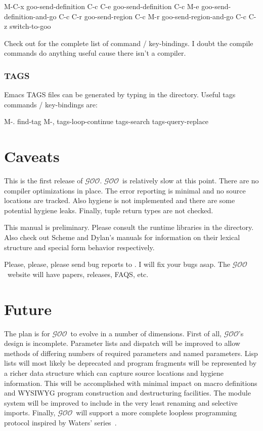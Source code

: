 \documentclass[twoside,twocolumn,9pt]{extarticle}
\newcommand{\goo}{$\mathcal{GOO}$}
\begin{document}
\begin{exv}
M-C-x   goo-send-definition
C-c C-e goo-send-definition
C-c M-e goo-send-definition-and-go
C-c C-r goo-send-region
C-c M-r goo-send-region-and-go
C-c C-z switch-to-goo
\end{exv}

Check out  for the complete list of command /
key-bindings. I doubt the compile commands do anything useful cause
there isn't a compiler.

\subsubsection{TAGS}

Emacs TAGS files can be generated by typing  in
the  directory.  Useful tags commands / key-bindings are:

\begin{exv}
M-.     find-tag
M-,     tags-loop-continue
        tags-search
        tags-query-replace
\end{exv}

\section{Caveats} 

This is the first release of \goo.
\goo\ is relatively slow at this point.  There are no compiler
optimizations in place.  The error reporting is minimal and no source
locations are tracked.  Also hygiene is not implemented and there are
some potential hygiene leaks.  Finally, tuple return types are not checked.

This manual is preliminary.  Please consult the runtime
libraries in the  directory.  Also check out Scheme and Dylan's
manuals for information on their lexical structure and special form
behavior respectively.

Please, please, please send bug reports to .  I
will fix your bugs asap.  The \goo\ website 
will have papers, releases, FAQS, etc.

\section{Future}

The plan is for \goo\ to evolve in a number of dimensions.  First of
all, \goo's design is incomplete.  Parameter lists and dispatch will
be improved to allow methods of differing numbers of required
parameters and named parameters.  Lisp lists will most likely be
deprecated and program fragments will be represented by a richer data
structure which can capture source locations and hygiene information.
This will be accomplished with minimal impact on macro definitions and
WYSIWYG program construction and destructuring facilities.  The module
system will be improved to include in the very least renaming and selective
imports. Finally, \goo\ will support a more complete loopless
programming protocol inspired by Waters'
series~\cite{Waters:1991:ATS}.
\end{document}
